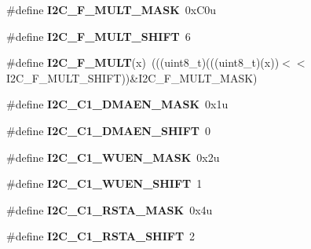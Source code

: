 \begin{DoxyCompactItemize}
\#define {\bfseries I2\+C\+\_\+\+F\+\_\+\+M\+U\+L\+T\+\_\+\+M\+A\+SK}~0x\+C0u
\item 
\mbox{\label{group___i2_c___register___masks_ga3a338cb3af4c140fde82427d091d5b4a}} 
\#define {\bfseries I2\+C\+\_\+\+F\+\_\+\+M\+U\+L\+T\+\_\+\+S\+H\+I\+FT}~6
\item 
\mbox{\label{group___i2_c___register___masks_ga8f7d596736ebbdc72c823abdc045adfd}} 
\#define {\bfseries I2\+C\+\_\+\+F\+\_\+\+M\+U\+LT}(x)~(((uint8\+\_\+t)(((uint8\+\_\+t)(x))$<$$<$I2\+C\+\_\+\+F\+\_\+\+M\+U\+L\+T\+\_\+\+S\+H\+I\+FT))\&I2\+C\+\_\+\+F\+\_\+\+M\+U\+L\+T\+\_\+\+M\+A\+SK)
\item 
\mbox{\label{group___i2_c___register___masks_gadfd8fccdd35a4944a1e53ffa26e5d06b}} 
\#define {\bfseries I2\+C\+\_\+\+C1\+\_\+\+D\+M\+A\+E\+N\+\_\+\+M\+A\+SK}~0x1u
\item 
\mbox{\label{group___i2_c___register___masks_ga1cd5f87cc18a56d293697f0463e2a9e3}} 
\#define {\bfseries I2\+C\+\_\+\+C1\+\_\+\+D\+M\+A\+E\+N\+\_\+\+S\+H\+I\+FT}~0
\item 
\mbox{\label{group___i2_c___register___masks_ga708d3eded28946d6f2e4b7ed5aff8fe8}} 
\#define {\bfseries I2\+C\+\_\+\+C1\+\_\+\+W\+U\+E\+N\+\_\+\+M\+A\+SK}~0x2u
\item 
\mbox{\label{group___i2_c___register___masks_gad1bec740751b47fd0f4e02d913c3b287}} 
\#define {\bfseries I2\+C\+\_\+\+C1\+\_\+\+W\+U\+E\+N\+\_\+\+S\+H\+I\+FT}~1
\item 
\mbox{\label{group___i2_c___register___masks_ga656f6747e8edc8299767365ea1ac9d70}} 
\#define {\bfseries I2\+C\+\_\+\+C1\+\_\+\+R\+S\+T\+A\+\_\+\+M\+A\+SK}~0x4u
\item 
\mbox{\label{group___i2_c___register___masks_gac6c61e0bd2615da3bbc3079984192dd7}} 
\#define {\bfseries I2\+C\+\_\+\+C1\+\_\+\+R\+S\+T\+A\+\_\+\+S\+H\+I\+FT}~2
\item 
\mbox{\label{group___i2_c___register___masks_gaebf88a6e1a433272e606980474b4e577}} 
$$
\end{DoxyCompactItemize}
